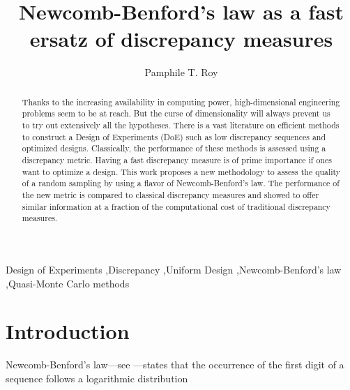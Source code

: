 \documentclass[1p,authoryear]{elsarticle}
\begin{document}
\begin{frontmatter}


\title{Newcomb-Benford's law as a fast ersatz of discrepancy measures}

\author[1]{Pamphile T. Roy}



\address[1]{iTranslate GmbH, Gadollaplatz 1, 8010, Graz, Austria}


\begin{abstract}

Thanks to the increasing availability in computing power, high-dimensional engineering problems seem to be at reach. But the curse of dimensionality will always prevent us to try out extensively all the hypotheses. There is a vast literature on efficient methods to construct a Design of Experiments (DoE) such as low discrepancy sequences and optimized designs. Classically, the performance of these methods is assessed using a discrepancy metric. Having a fast discrepancy measure is of prime importance if ones want to optimize a design. This work proposes a new methodology to assess the quality of a random sampling by using a flavor of Newcomb-Benford's law. The performance of the new metric is compared to classical discrepancy measures and showed to offer similar information at a fraction of the computational cost of traditional discrepancy measures.


\end{abstract}

\begin{keyword}
Design of Experiments \sep Discrepancy \sep Uniform Design \sep Newcomb-Benford's law \sep Quasi-Monte Carlo methods
\end{keyword}


\end{frontmatter}


\section{Introduction}



Newcomb-Benford's law---see \citep{Newcomb1881,Benford1938}---states that the occurrence of the first digit of a sequence follows a logarithmic distribution
\end{document}
